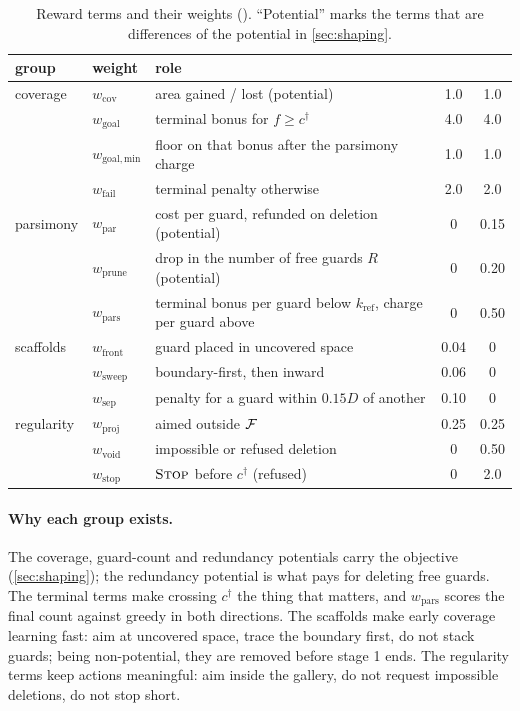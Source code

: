 \documentclass[11pt,a4paper]{article}
\begin{document}
\begin{table}[!htbp]
\centering\small
\caption{Reward terms and their weights (). ``Potential'' marks the terms
that are differences of the potential in \cref{sec:shaping}.}
\label{tab:weights}
\begin{tabularx}{\linewidth}{llXcc}
\toprule
group & weight & role & \stageI{} & \stageII{} \\
\midrule
coverage   & $w_{\mathrm{cov}}$   & area gained / lost (potential) & 1.0 & 1.0 \\
           & $w_{\mathrm{goal}}$  & terminal bonus for $f\ge c^\dagger$ & 4.0 & 4.0 \\
           & $w_{\mathrm{goal,min}}$ & floor on that bonus after the parsimony charge & 1.0 & 1.0 \\
           & $w_{\mathrm{fail}}$  & terminal penalty otherwise & 2.0 & 2.0 \\
parsimony  & $w_{\mathrm{par}}$   & cost per guard, refunded on deletion (potential) & 0 & 0.15 \\
           & $w_{\mathrm{prune}}$ & drop in the number of free guards $R$ (potential) & 0 & 0.20 \\
           & $w_{\mathrm{pars}}$  & terminal bonus per guard below $k_{\mathrm{ref}}$, charge per guard above & 0 & 0.50 \\
scaffolds  & $w_{\mathrm{front}}$ & guard placed in uncovered space & 0.04 & 0 \\
           & $w_{\mathrm{sweep}}$ & boundary-first, then inward & 0.06 & 0 \\
           & $w_{\mathrm{sep}}$   & penalty for a guard within $0.15D$ of another & 0.10 & 0 \\
regularity & $w_{\mathrm{proj}}$  & aimed outside $\mathcal{F}$ & 0.25 & 0.25 \\
           & $w_{\mathrm{void}}$  & impossible or refused deletion & 0 & 0.50 \\
           & $w_{\mathrm{stop}}$  & $\textsc{Stop}$ before $c^\dagger$ (refused) & 0 & 2.0 \\
\bottomrule
\end{tabularx}
\end{table}

\paragraph{Why each group exists.}
The coverage, guard-count and redundancy potentials carry the objective
(\cref{sec:shaping}); the redundancy potential is what pays for deleting free guards. The terminal
terms make crossing $c^\dagger$ the thing that matters, and $w_{\mathrm{pars}}$ scores the final
count against greedy in both directions. The scaffolds make early coverage learning fast: aim at
uncovered space, trace the boundary first, do not stack guards; being non-potential, they are
removed before stage 1 ends. The regularity terms keep actions meaningful: aim inside the
gallery, do not request impossible deletions, do not stop short.
\end{document}
